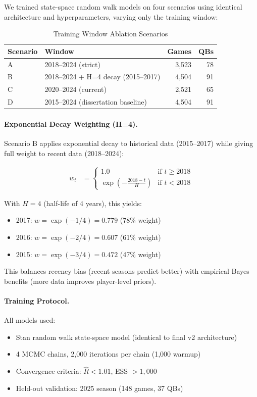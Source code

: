 We trained state-space random walk models on four scenarios using identical architecture and hyperparameters, varying only the training window:

\begin{table}[htbp]
\centering
\caption{Training Window Ablation Scenarios}
\label{tab:ablation_scenarios}
\begin{tabular}{llrr}
\toprule
\textbf{Scenario} & \textbf{Window} & \textbf{Games} & \textbf{QBs} \\
\midrule
A & 2018--2024 (strict) & 3,523 & 78 \\
B & 2018--2024 + H=4 decay (2015--2017) & 4,504 & 91 \\
C & 2020--2024 (current) & 2,521 & 65 \\
D & 2015--2024 (dissertation baseline) & 4,504 & 91 \\
\bottomrule
\end{tabular}
\end{table}

\paragraph{Exponential Decay Weighting (H=4).}
Scenario B applies exponential decay to historical data (2015--2017) while giving full weight to recent data (2018--2024):

\begin{align}
w_t &= \begin{cases}
1.0 & \text{if } t \geq 2018 \\
\exp\left(-\frac{2018 - t}{H}\right) & \text{if } t < 2018
\end{cases}
\end{align}

With $H=4$ (half-life of 4 years), this yields:
\begin{itemize}
    \item 2017: $w = \exp(-1/4) = 0.779$ (78\% weight)
    \item 2016: $w = \exp(-2/4) = 0.607$ (61\% weight)
    \item 2015: $w = \exp(-3/4) = 0.472$ (47\% weight)
\end{itemize}

This balances recency bias (recent seasons predict better) with empirical Bayes benefits (more data improves player-level priors).

\paragraph{Training Protocol.}
All models used:
\begin{itemize}
    \item Stan random walk state-space model (identical to final v2 architecture)
    \item 4 MCMC chains, 2,000 iterations per chain (1,000 warmup)
    \item Convergence criteria: $\hat{R} < 1.01$, ESS $> 1,000$
    \item Held-out validation: 2025 season (148 games, 37 QBs)
\end{itemize}


